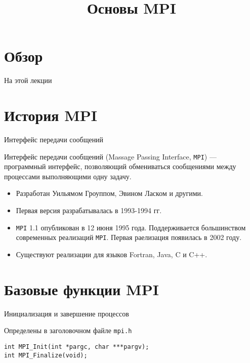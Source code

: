 

\title{Основы MPI}



\begin{frame}
\titlepage
\end{frame}

\section*{Обзор}

\begin{frame}{На этой лекции}
\tableofcontents
\end{frame} 

\section{История MPI}

\begin{frame}{Интерфейс передачи сообщений}

Интерфейс передачи сообщений (\abbr Massage Passing Interface, \texttt{MPI}) --- программный интерфейс, позволяющий обмениваться сообщениями между процессами выполняющими одну задачу.

\begin{itemize}
    \item Разработан Уильямом Гроуппом, Эвином Ласком и другими.
    \item Первая версия разрабатывалась в 1993-1994 гг.
    \item \texttt{MPI} 1.1 опубликован в 12 июня 1995 года. Поддерживается большинством современных реализаций \texttt{MPI}. Первая раелизация появилась в 2002 году.
    \item Существуют реализации для языков Fortran, Java, C и C++.
\end{itemize}

\end{frame}

\section{Базовые функции MPI}

\begin{frame}[fragile]{Инициализация и завершение процессов}

Определены в заголовочном файле \texttt{mpi.h}

\vfill

\begin{lstlisting}
int MPI_Init(int *pargc, char ***pargv);
int MPI_Finalize(void);
\end{lstlisting}

\end{frame}

